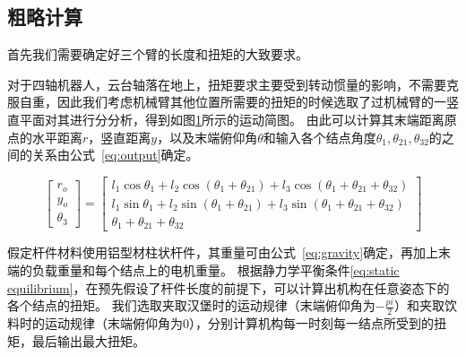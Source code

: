 
    \subsection{粗略计算}
    \label{subsec:roughCal}

    首先我们需要确定好三个臂的长度和扭矩的大致要求。

    对于四轴机器人，云台轴落在地上，扭矩要求主要受到转动惯量的影响，不需要克服自重，因此我们考虑机械臂其他位置所需要的扭矩的时候选取了过机械臂的一竖直平面对其进行分分析，得到如图\ref{fig:robot_motion}所示的运动简图。
    由此可以计算其末端距离原点的水平距离$r$，竖直距离$y$，以及末端俯仰角$\theta$和输入各个结点角度$\theta_{1}, \theta_{21}, \theta_{32}$的之间的关系由公式~\ref{eq:output}确定。

    \begin{figure}[!htp]
        \centering
        \resizebox{\textwidth}{!}{}
        \label{fig:robot_motion}
    \end{figure}

    \begin{equation}
    \label{eq:output}
    \begin{bmatrix}
    r_o \\
    y_o \\ 
    \theta_3
    \end{bmatrix}
    =
    \begin{bmatrix}
    l_1 \cos{\theta_1} + l_2 \cos(\theta_1 +\theta_{21}) + l_3 \cos(\theta_1 + \theta_{21} + \theta_{32}) \\
    l_1 \sin{\theta_1} + l_2 \sin(\theta_1 + \theta_{21}) + l_3 \sin(\theta_1 +\theta_{21} + \theta_{32}) \\
    \theta_1 + \theta_{21} + \theta_{32}
    \end{bmatrix}
    \end{equation}

    假定杆件材料使用铝型材柱状杆件，其重量可由公式~\ref{eq:gravity}确定，再加上末端的负载重量和每个结点上的电机重量。
    根据静力学平衡条件\ref{eq:static equilibrium}，在预先假设了杆件长度的前提下，可以计算出机构在任意姿态下的各个结点的扭矩。
    我们选取夹取汉堡时的运动规律（末端俯仰角为$-\frac{pi}{2}$）和夹取饮料时的运动规律（末端俯仰角为$0$），分别计算机构每一时刻每一结点所受到的扭矩，最后输出最大扭矩。

